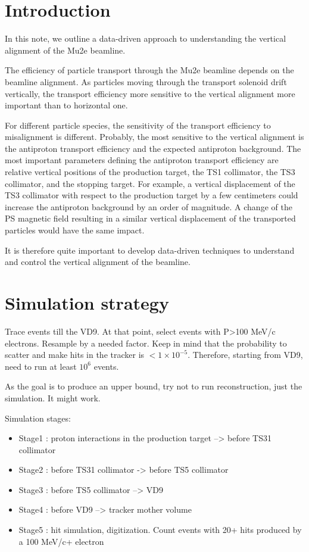 \documentclass[12pt]{article}
\begin{document}
\section {Introduction}

In this note, we outline a data-driven approach to understanding the vertical alignment of the
Mu2e beamline.

The efficiency of particle transport through the Mu2e beamline depends on the beamline
alignment. As particles moving through the transport solenoid drift vertically,
the transport efficiency more sensitive to the vertical alignment more important than
to horizontal one.

For different particle species, the sensitivity of the transport efficiency to misalignment
is different. Probably, the most sensitive to the vertical alignment is the antiproton
transport efficiency and the expected antiproton background.
% 
The most important parameters defining the antiproton transport efficiency are relative
vertical positions of the production target, the TS1 collimator, the TS3 collimator,
and the stopping target. For example, a vertical displacement of the TS3 collimator 
with respect to the production target by a few centimeters could increase the antiproton
background by an order of magnitude. A change of the PS magnetic field resulting 
in a similar vertical displacement of the transported particles would have the same impact.

It is therefore quite important to develop data-driven techniques to understand and control
the vertical alignment of the beamline.

\section {Simulation strategy}

Trace events till the VD9. At that point, select events with P>100 MeV/c electrons.
Resample by a needed factor.
Keep in mind that the probability to scatter and make hits in the tracker is $< 1 \times 10^{-5}$.
Therefore, starting from VD9, need to run at least $10^6$ events.

As the goal is to produce an upper bound, try not to run reconstruction, just the simulation.
It might work.

Simulation stages:

\begin{itemize}
\item
  Stage1 : proton interactions in the production target --> before TS31 collimator 
\item
  Stage2 : before TS31 collimator -> before TS5 collimator
\item
  Stage3 : before TS5 collimator --> VD9
\item
  Stage4 : before VD9 --> tracker mother volume
\item
  Stage5 : hit simulation, digitization. Count events with 20+ hits produced by a 100 MeV/c+ electron
\end{itemize}
\end{document}
